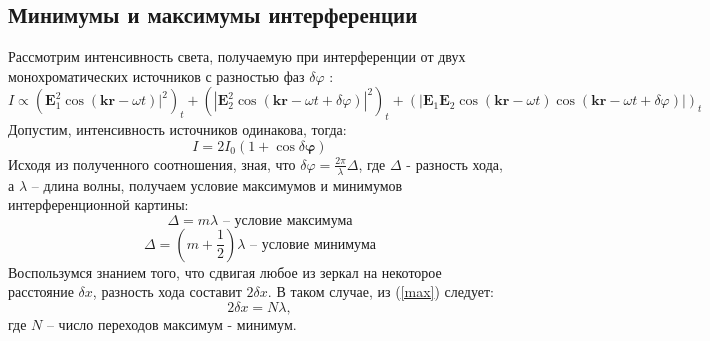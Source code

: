 \documentclass[a4paper, 12pt]{article}
\renewcommand{\phi}{\varphi} %
\begin{document}
	\subsection*{Минимумы и максимумы интерференции}
	Рассмотрим интенсивность света, получаемую при интерференции от двух монохроматических источников с разностью фаз $\delta \phi$ :
	\begin{equation}
				I \propto ( \mathbf{E}^2_1 \cos(\mathbf{kr} - \omega t)|^2 )_t +
				( |\mathbf{E}^2_2 \cos(\mathbf{kr} - \omega t + \delta \phi)|^2)_t+ (|\mathbf{E}_1 \mathbf{E}_2\cos(\mathbf{kr} - \omega t)\cos(\mathbf{kr} - \omega t + \delta \phi)|)_t
	\end{equation}
	Допустим, интенсивность источников одинакова, тогда:
	\begin{equation}\label{int}
		I = 2 I_0 (1 + \cos{\delta\mathbf{\phi}})
	\end{equation}
	Исходя из полученного соотношения, зная, что $\delta \phi = \frac{2 \pi}{\lambda} \Delta$, где $\Delta$ - разность хода, а $\lambda$ -- длина волны, получаем условие максимумов и минимумов интерференционной картины:
	\begin{equation}\label{max}
		\Delta = m \lambda \text{ -- условие максимума}
	\end{equation}
	\begin{equation}\label{min}
		\Delta = (m + \frac{1}{2}) \lambda \text{ -- условие минимума}
	\end{equation}
	 Воспользумся знанием того, что сдвигая любое из зеркал на некоторое расстояние $\delta x$, разность хода составит $2\delta x$. В таком случае, из (\ref{max}) следует:
	\begin{equation}\label{deltax}
		2 \delta x = N \lambda,
	\end{equation}
	где $N$ -- число переходов максимум - минимум.
\end{document}
